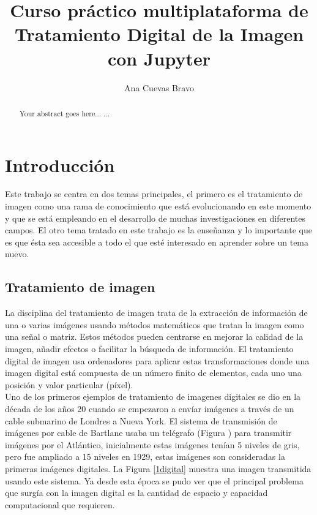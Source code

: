 \documentclass[a4paper,12pt]{report}
\begin{document}
\title{Curso práctico multiplataforma de Tratamiento Digital de la Imagen con Jupyter}
\author{ Ana Cuevas Bravo}
\maketitle

\newpage
{}

\renewcommand{\abstractname}{Resumen}
\renewcommand{\chaptername}{Capítulo}

\begin{abstract}
Your abstract goes here...
...
\end{abstract}


\tableofcontents
\newpage
{}

\chapter{Introducción}

Este trabajo se centra en dos temas principales, el primero es el tratamiento de imagen como una rama de conocimiento que está evolucionando en este momento y que se está empleando en el desarrollo de muchas investigaciones en diferentes campos. El otro tema tratado en este trabajo es la enseñanza y lo importante que es que ésta sea accesible a todo el que esté interesado en aprender sobre un tema nuevo.
\section{Tratamiento de imagen}

La disciplina del tratamiento de imagen trata de la extracción de información de una o varias imágenes usando métodos matemáticos que tratan la imagen como una señal o matriz. Estos métodos pueden centrarse en mejorar la calidad de la imagen, añadir efectos o facilitar la búsqueda de información. El tratamiento digital de imagen usa ordenadores para aplicar estas transformaciones donde una imagen digital está compuesta de un número finito de elementos, cada uno una posición y valor particular (píxel).\\

Uno de los primeros ejemplos de tratamiento de imagenes digitales se dio en la década de los años 20 cuando se empezaron a envíar imágenes a través de un cable submarino de Londres a Nueva York. El sistema de transmisión de imágenes por cable de Bartlane usaba un telégrafo (Figura ) para transmitir imágenes por el Atlántico, inicialmente estas imágenes tenían 5 niveles de gris, pero fue ampliado a 15 niveles en 1929, estas imágenes son consideradas la primeras imágenes digitales. La Figura \ref{1digital} muestra una imagen transmitida usando este sistema. Ya desde esta época se pudo ver que el principal problema que surgía con la imagen digital es la cantidad de espacio y capacidad computacional que requieren.\\
\end{document}
